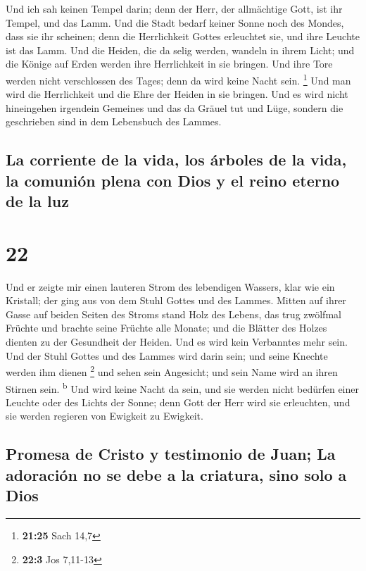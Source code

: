  Und ich sah keinen Tempel darin; denn der Herr, der
allmächtige Gott, ist ihr Tempel, und das Lamm.  Und die
Stadt bedarf keiner Sonne noch des Mondes, dass sie ihr scheinen; denn
die Herrlichkeit Gottes erleuchtet sie, und ihre Leuchte ist das Lamm.
 Und die Heiden, die da selig werden, wandeln in ihrem
Licht; und die Könige auf Erden werden ihre Herrlichkeit in sie bringen.
 Und ihre Tore werden nicht verschlossen des Tages; denn
da wird keine Nacht sein. \footnote{\textbf{21:25} Sach 14,7}
 Und man wird die Herrlichkeit und die Ehre der Heiden in
sie bringen.  Und es wird nicht hineingehen irgendein
Gemeines und das da Gräuel tut und Lüge, sondern die geschrieben sind in
dem Lebensbuch des Lammes.

\hypertarget{la-corriente-de-la-vida-los-uxe1rboles-de-la-vida-la-comuniuxf3n-plena-con-dios-y-el-reino-eterno-de-la-luz}{%
\subsection{La corriente de la vida, los árboles de la vida, la comunión
plena con Dios y el reino eterno de la
luz}\label{la-corriente-de-la-vida-los-uxe1rboles-de-la-vida-la-comuniuxf3n-plena-con-dios-y-el-reino-eterno-de-la-luz}}

\hypertarget{section-21}{%
\section{22}\label{section-21}}

 Und er zeigte mir einen lauteren Strom des lebendigen
Wassers, klar wie ein Kristall; der ging aus von dem Stuhl Gottes und
des Lammes.  Mitten auf ihrer Gasse auf beiden Seiten des
Stroms stand Holz des Lebens, das trug zwölfmal Früchte und brachte
seine Früchte alle Monate; und die Blätter des Holzes dienten zu der
Gesundheit der Heiden.  Und es wird kein Verbanntes mehr
sein. Und der Stuhl Gottes und des Lammes wird darin sein; und seine
Knechte werden ihm dienen \footnote{\textbf{22:3} Jos 7,11-13}
 und sehen sein Angesicht; und sein Name wird an ihren
Stirnen sein. \textsuperscript{b}  Und wird keine Nacht da
sein, und sie werden nicht bedürfen einer Leuchte oder des Lichts der
Sonne; denn Gott der Herr wird sie erleuchten, und sie werden regieren
von Ewigkeit zu Ewigkeit.

\hypertarget{promesa-de-cristo-y-testimonio-de-juan-la-adoraciuxf3n-no-se-debe-a-la-criatura-sino-solo-a-dios}{%
\subsection{Promesa de Cristo y testimonio de Juan; La adoración no se
debe a la criatura, sino solo a
Dios}\label{promesa-de-cristo-y-testimonio-de-juan-la-adoraciuxf3n-no-se-debe-a-la-criatura-sino-solo-a-dios}}

